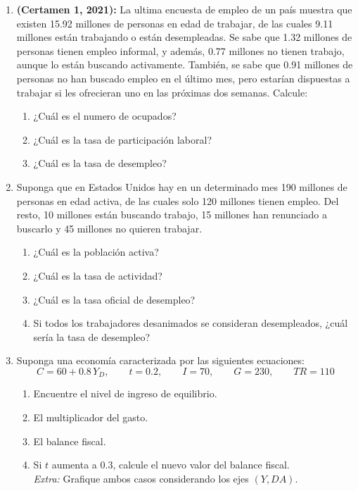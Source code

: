\documentclass[11pt,addpoints]{article}
\begin{document}
\begin{enumerate}[label=\textbf{\arabic*.}]

\item \textbf{(Certamen 1, 2021):} La ultima encuesta de empleo de un país muestra que existen 15.92 millones de personas en edad de trabajar, de las cuales 9.11 millones están trabajando o están desempleadas. Se sabe que 1.32 millones de personas tienen empleo informal, y además, 0.77 millones no tienen trabajo, aunque lo están buscando activamente. También, se sabe que 0.91 millones de personas no han buscado empleo en el último mes, pero estarían dispuestas a trabajar si les ofrecieran uno en las próximas dos semanas. Calcule:
\begin{enumerate}[label=\alph*)]
\item ¿Cuál es el numero de ocupados?
\item ¿Cuál es la tasa de participación laboral?
\item ¿Cuál es la tasa de desempleo?
\end{enumerate}


\item Suponga que en Estados Unidos hay en un determinado mes 190 millones de personas en
edad activa, de las cuales solo 120 millones tienen empleo. Del resto, 10 millones están
buscando trabajo, 15 millones han renunciado a buscarlo y 45 millones no quieren trabajar.
\begin{enumerate}[label=\alph*)]
\item ¿Cuál es la población activa?
\item ¿Cuál es la tasa de actividad?
\item ¿Cuál es la tasa oficial de desempleo?

\newpage
\vspace*{0.1cm}
\item Si todos los trabajadores desanimados se consideran desempleados, ¿cuál sería la tasa de
desempleo?
\end{enumerate}

\item Suponga una economía caracterizada por las siguientes ecuaciones:
\[
C = 60 + 0.8\,Y_D,\qquad t = 0.2,\qquad I = 70,\qquad G = 230,\qquad TR = 110
\]
\begin{enumerate}[label=\alph*)]
\item Encuentre el nivel de ingreso de equilibrio.
\item El multiplicador del gasto.
\item El balance fiscal.
\item Si $t$ aumenta a 0.3, calcule el nuevo valor del balance fiscal.\\
\textit{Extra:} Grafique ambos casos considerando los ejes $(Y,DA)$.
\end{enumerate}



\end{enumerate}
\end{document}
